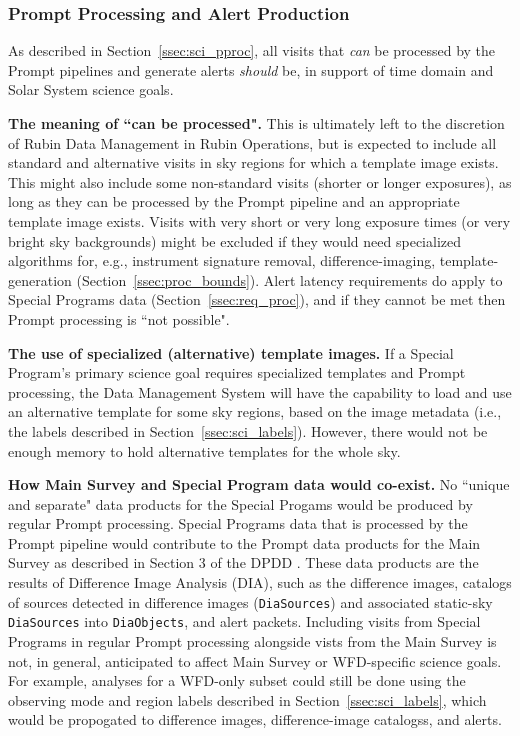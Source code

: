 \subsubsection{Prompt Processing and Alert Production}\label{sssec:proc_reg_prompt}

As described in Section~\ref{ssec:sci_pproc}, 
all visits that \emph{can} be processed by the Prompt pipelines and generate 
alerts \emph{should} be, in support of time domain and Solar System science goals.

\textbf{The meaning of ``can be processed".}
This is ultimately left to the discretion of
Rubin Data Management in Rubin Operations, but is expected to include
all standard and alternative visits in sky regions for which a template image exists.
This might also include some non-standard visits (shorter or longer exposures), 
as long as they can be processed by the Prompt pipeline and an appropriate template image exists.
Visits with very short or very long exposure times (or very bright sky 
backgrounds) might be excluded if they would need specialized algorithms for,
e.g., instrument signature removal, difference-imaging, template-generation 
(Section~\ref{ssec:proc_bounds}).
Alert latency requirements do apply to Special Programs data (Section~\ref{ssec:req_proc}),
and if they cannot be met then Prompt processing is ``not possible".

\textbf{The use of specialized (alternative) template images.}
If a Special Program's primary science goal requires specialized templates and 
Prompt processing, the Data Management System will have the capability to load 
and use an alternative template for some sky regions, based on the image metadata 
(i.e., the labels described in Section~\ref{ssec:sci_labels}). 
However, there would not be enough memory to hold alternative templates 
for the whole sky.

\textbf{How Main Survey and Special Program data would co-exist.}
No ``unique and separate" data products for the Special Progams would be 
produced by regular Prompt processing.
Special Programs data that is processed by the Prompt pipeline would 
contribute to the Prompt data products for the Main Survey as 
described in Section 3 of the DPDD . 
These data products are the results of Difference Image Analysis (DIA),
such as the difference images, catalogs of sources detected in difference
images ({\tt DiaSources}) and associated static-sky {\tt DiaSources}
into {\tt DiaObjects}, and alert packets.
Including visits from Special Programs in regular Prompt processing alongside
vists from the Main Survey is not, in general, anticipated to affect Main Survey 
or WFD-specific science goals.
For example, analyses for a WFD-only subset could still be done using the observing mode
and region labels described in Section~\ref{ssec:sci_labels}, which would be
propogated to difference images, difference-image catalogss, and alerts.

